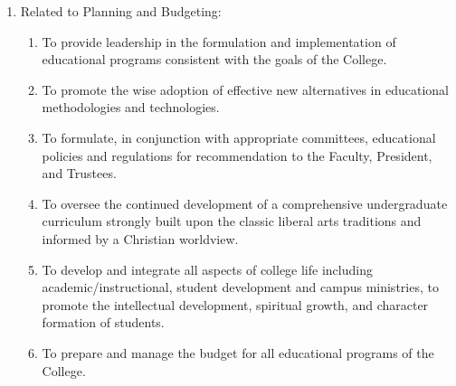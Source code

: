 \documentclass[letterpaper, 11pt]{article}
\newcounter{subsubparagraph}
\begin{document}
\begin{enumerate}
{\begin{enumerate}
{\begin{enumerate}
{\begin{enumerate}
											\end{enumerate}
										}
										\item{To serve ex officio on College committees and to chair the following:
											\begin{enumerate}
												\item{Faculty meeting as a committee of the whole}
												\item{Academic Senate}
												\item{and to establish ad hoc committees as may be appropriate}
											\end{enumerate}
										}
									\end{enumerate}
								}
								\item{Related to Planning and Budgeting:
									\begin{enumerate}
										\item{To provide leadership in the formulation and implementation of educational programs consistent with the goals of the College.}
										\item{To promote the wise adoption of effective new alternatives in educational methodologies and technologies.}
										\item{To formulate, in conjunction with appropriate committees, educational policies and regulations for recommendation to the Faculty, President, and Trustees.}
										\item{To oversee the continued development of a comprehensive undergraduate curriculum strongly built upon the classic liberal arts traditions and informed by a Christian worldview.}
										\item{To develop and integrate all aspects of college life including academic/instructional, student development and campus ministries, to promote the intellectual development, spiritual growth, and character formation of students.}
										\item{To prepare and manage the budget for all educational programs of the College.}
									\end{enumerate}
								}
							\end{enumerate}
						}
					\end{enumerate}
\end{document}
